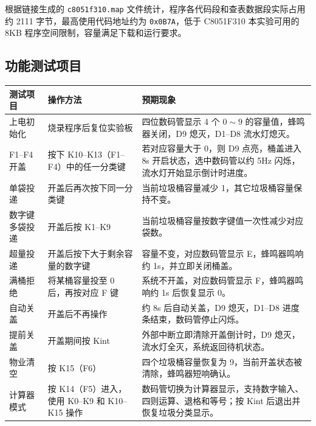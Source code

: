 \documentclass[12pt,a4paper]{article}
\begin{document}
根据链接生成的 \texttt{c8051f310.map} 文件统计，程序各代码段和查表数据段实际占用约 2111 字节，最高使用代码地址约为 \texttt{0x0B7A}，低于 C8051F310 本实验可用的 8KB 程序空间限制，容量满足下载和运行要求。

\subsection{功能测试项目}
\begin{table}[H]
    \centering
    \small
    \begin{tabular}{|p{2.5cm}|p{4.3cm}|p{6.5cm}|}
        \hline
        测试项目 & 操作方法 & 预期现象 \\
        \hline
        上电初始化 & 烧录程序后复位实验板 & 四位数码管显示 4 个 $0\sim9$ 的容量值，蜂鸣器关闭，D9 熄灭，D1--D8 流水灯熄灭。 \\
        \hline
        F1--F4 开盖 & 按下 K10--K13（F1--F4）中的任一分类键 & 若对应容量大于 0，则 D9 点亮，桶盖进入 8s 开启状态，选中数码管以约 5Hz 闪烁，流水灯开始显示倒计时进度。 \\
        \hline
        单袋投递 & 开盖后再次按下同一分类键 & 当前垃圾桶容量减少 1，其它垃圾桶容量保持不变。 \\
        \hline
        数字键多袋投递 & 开盖后按 K1--K9 & 当前垃圾桶容量按数字键值一次性减少对应袋数。 \\
        \hline
        超量投递 & 开盖后按下大于剩余容量的数字键 & 容量不变，对应数码管显示 E，蜂鸣器鸣响约 1s，并立即关闭桶盖。 \\
        \hline
        满桶拒绝 & 将某桶容量投至 0 后，再按对应 F 键 & 系统不开盖，对应数码管显示 F，蜂鸣器鸣响约 1s 后恢复显示 0。 \\
        \hline
        自动关盖 & 开盖后不再操作 & 约 8s 后自动关盖，D9 熄灭，D1--D8 进度条结束，数码管停止闪烁。 \\
        \hline
        提前关盖 & 开盖期间按 Kint & 外部中断立即清除开盖倒计时，D9 熄灭，流水灯全灭，系统返回待机状态。 \\
        \hline
        物业清空 & 按 K15（F6） & 四个垃圾桶容量恢复为 9，当前开盖状态被清除，蜂鸣器短响确认。 \\
        \hline
        计算器模式 & 按 K14（F5）进入，使用 K0--K9 和 K10--K15 操作 & 数码管切换为计算器显示，支持数字输入、四则运算、退格和等号；按 Kint 后退出并恢复垃圾分类显示。 \\
        \hline
    \end{tabular}
\end{table}
\end{document}
